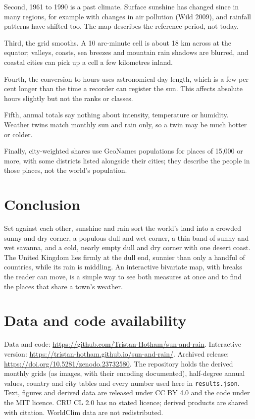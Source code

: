\documentclass[11pt,a4paper]{article}
\begin{document}
Second, 1961 to 1990 is a past climate. Surface sunshine has changed since in many regions, for example with changes in air pollution (Wild 2009), and rainfall patterns have shifted too. The map describes the reference period, not today.

Third, the grid smooths. A 10 arc-minute cell is about 18 km across at the equator; valleys, coasts, sea breezes and mountain rain shadows are blurred, and coastal cities can pick up a cell a few kilometres inland.

Fourth, the conversion to hours uses astronomical day length, which is a few per cent longer than the time a recorder can register the sun. This affects absolute hours slightly but not the ranks or classes.

Fifth, annual totals say nothing about intensity, temperature or humidity. Weather twins match monthly sun and rain only, so a twin may be much hotter or colder.

Finally, city-weighted shares use GeoNames populations for places of 15,000 or more, with some districts listed alongside their cities; they describe the people in those places, not the world's population.

\section{Conclusion}

Set against each other, sunshine and rain sort the world's land into a crowded sunny and dry corner, a populous dull and wet corner, a thin band of sunny and wet savanna, and a cold, nearly empty dull and dry corner with one desert coast. The United Kingdom lies firmly at the dull end, sunnier than only a handful of countries, while its rain is middling. An interactive bivariate map, with breaks the reader can move, is a simple way to see both measures at once and to find the places that share a town's weather.

\section*{Data and code availability}

Data and code: \url{https://github.com/Tristan-Hotham/sun-and-rain}. Interactive version: \url{https://tristan-hotham.github.io/sun-and-rain/}. Archived release: \url{https://doi.org/10.5281/zenodo.23732580}. The repository holds the derived monthly grids (as images, with their encoding documented), half-degree annual values, country and city tables and every number used here in \texttt{results.json}. Text, figures and derived data are released under CC BY 4.0 and the code under the MIT licence. CRU CL 2.0 has no stated licence; derived products are shared with citation. WorldClim data are not redistributed.
\end{document}
